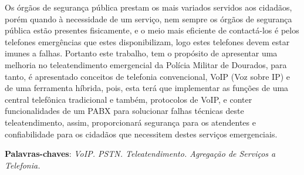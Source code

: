 \setlength{\absparsep}{18pt} %
\begin{resumo}

Os órgãos de segurança pública prestam os mais variados servidos aos cidadãos, porém quando à necessidade de um serviço, nem sempre os órgãos de segurança pública estão presentes fisicamente, e o meio mais eficiente de contactá-los é pelos telefones emergências que estes disponibilizam, logo estes telefones devem estar imunes a falhas. Portanto este trabalho, tem o propósito de apresentar uma melhoria no teleatendimento emergencial da Polícia Militar de Dourados, para tanto, é apresentado conceitos de telefonia convencional, VoIP (Voz sobre IP) e de uma ferramenta híbrida, pois, esta terá que implementar as funções de uma central telefônica tradicional e também, protocolos de VoIP, e conter funcionalidades de um PABX para solucionar falhas técnicas deste teleatendimento, assim, proporcionará segurança para os atendentes e confiabilidade para os cidadãos que necessitem destes serviços emergenciais.

 \textbf{Palavras-chaves}: \textit{VoIP. PSTN. Teleatendimento. Agregação de Serviços a Telefonia.}
\end{resumo}
